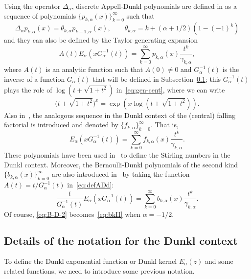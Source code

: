 \documentclass[11pt]{article}
\theoremstyle{plain}
\theoremstyle{remark}
\numberwithin{equation}{section} %
\newcommand{\Ea}{E_{\alpha}}
\begin{document}
Using the operator $\Delta_{\alpha}$, discrete Appell-Dunkl polynomials are defined in \cite{ELMV} as a sequence of polynomials $\{p_{k,\alpha}(x)\}_{k=0}^{\infty}$ such that
\begin{equation}
\label{eq:Delta-AD}
  \Delta_{\alpha}p_{k,\alpha}(x) = \theta_{k,\alpha} p_{k-1,\alpha}(x),
  \qquad \theta_{k,\alpha} = k+(\alpha+1/2)(1-(-1)^k)
\end{equation}
and they can also be defined by the Taylor generating expansion
\begin{equation}
\label{eq:defADd}
  A(t) \Ea(x G_{\alpha}^{-1}(t)) = \sum_{k=0}^{\infty} p_{k,\alpha}(x) \frac{t^k}{\gamma_{k,\alpha}},
\end{equation}
where $A(t)$ is an analytic function such that $A(0)\ne 0$ and $G_{\alpha}^{-1}(t)$ is the inverse of a function $G_{\alpha}(t)$ that will be defined in Subsection~\ref{subsec:Dunkl}; this $G_{\alpha}^{-1}(t)$ plays the role of $\log(t+\sqrt{1+t^2})$ in~\eqref{eq:gen-cent}, where we can write
\[
  \big(t+\sqrt{1+t^2}\big)^x = \exp(x\log(t+\sqrt{1+t^2})).
\]
Also in~\cite{ELMV}, the analogous sequence in the Dunkl context of the (central) falling factorial is introduced and denoted by $\{f_{k,\alpha}\}_{k=0}^{\infty}$. That is,
\begin{equation}
\label{eq:fact-cent}
  \Ea(x G_{\alpha}^{-1}(t)) = \sum_{k=0}^{\infty} f_{k,\alpha}(x) \frac{t^k}{\gamma_{k,\alpha}}.
\end{equation}
These polynomials have been used in~\cite{MV2} to define the Stirling numbers in the Dunkl context. Moreover, the Bernoulli-Dunkl polynomials of the second kind $\{b_{k,\alpha}(x)\}_{k=0}^{\infty}$ are also introduced in~\cite[\S\,6]{ELMV} by taking the function $A(t)=t/G_{\alpha}^{-1}(t)$ in~\eqref{eq:defADd}:
\begin{equation}
\label{eq:B-D-2}
  \frac{t}{G_{\alpha}^{-1}(t)}\Ea(x G_{\alpha}^{-1}(t))
  = \sum_{k=0}^{\infty} b_{k,\alpha}(x) \frac{t^k}{\gamma_{k,\alpha}}.
\end{equation}
Of course, \eqref{eq:B-D-2} becomes~\eqref{eq:bkII} when $\alpha=-1/2$.

\subsection{Details of the notation for the Dunkl context}
\label{subsec:Dunkl}

To define the Dunkl exponential function  or Dunkl kernel $\Ea(z)$ and some related functions, we need to introduce some previous notation. 
\end{document}
